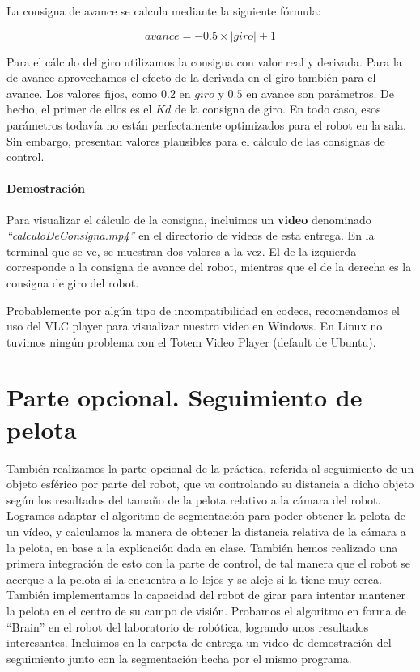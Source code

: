 \documentclass{article}
\begin{document}
        La consigna de avance se calcula mediante la siguiente fórmula:

        $$avance = -0.5 \times |giro| + 1$$

        Para el cálculo del giro utilizamos la consigna con valor real y derivada. Para la de avance aprovechamos el efecto de la derivada en el giro también para el avance. Los valores fijos, como $0.2$ en $giro$ y $0.5$ en avance son parámetros. De hecho, el primer de ellos es el $Kd$ de la consigna de giro. En todo caso, esos parámetros todavía no están perfectamente optimizados para el robot en la sala. Sin embargo, presentan valores plausibles para el cálculo de las consignas de control.

        \paragraph{Demostración}
        Para visualizar el cálculo de la consigna, incluimos un \textbf{video} denominado \textit{``calculoDeConsigna.mp4''} en el directorio de videos de esta entrega. En la terminal que se ve, se muestran dos valores a la vez. El de la izquierda corresponde a la consigna de avance del robot, mientras que el de la derecha es la consigna de giro del robot.

        Probablemente por algún tipo de incompatibilidad en codecs, recomendamos el uso del VLC player para visualizar nuestro video en Windows. En Linux no tuvimos ningún problema con el Totem Video Player (default de Ubuntu).

\section{Parte opcional. Seguimiento de pelota}
	También realizamos la parte opcional de la práctica, referida al seguimiento de un objeto esférico por parte del robot, que va controlando su distancia a dicho objeto según los resultados del tamaño de la pelota relativo a la cámara del robot. Logramos adaptar el algoritmo de segmentación para poder obtener la pelota de un vídeo, y calculamos la manera de obtener la distancia relativa de la cámara a la pelota, en base a la explicación dada en clase. También hemos realizado una primera integración de esto con la parte de control, de tal manera que el robot se acerque a la pelota si la encuentra a lo lejos y se aleje si la tiene muy cerca. También implementamos la capacidad del robot de girar para intentar mantener la pelota en el centro de su campo de visión. Probamos el algoritmo en forma de “Brain” en el robot del laboratorio de robótica, logrando unos resultados interesantes. Incluimos en la carpeta de entrega un video de demostración del seguimiento junto con la segmentación hecha por el mismo programa.
\end{document}
